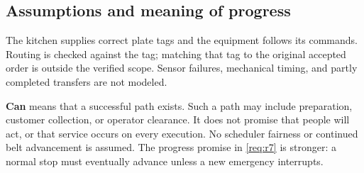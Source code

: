 \documentclass[11pt,a4paper]{article}
\begin{document}
\subsection{Assumptions and meaning of progress}
The kitchen supplies correct plate tags and the equipment follows its commands. Routing is checked against the tag; matching that tag to the original accepted order is outside the verified scope. Sensor failures, mechanical timing, and partly completed transfers are not modeled.

\textbf{Can} means that a successful path exists. Such a path may include preparation, customer collection, or operator clearance. It does not promise that people will act, or that service occurs on every execution. No scheduler fairness or continued belt advancement is assumed. The progress promise in \ref{req:r7} is stronger: a normal stop must eventually advance unless a new emergency interrupts.
\end{document}
